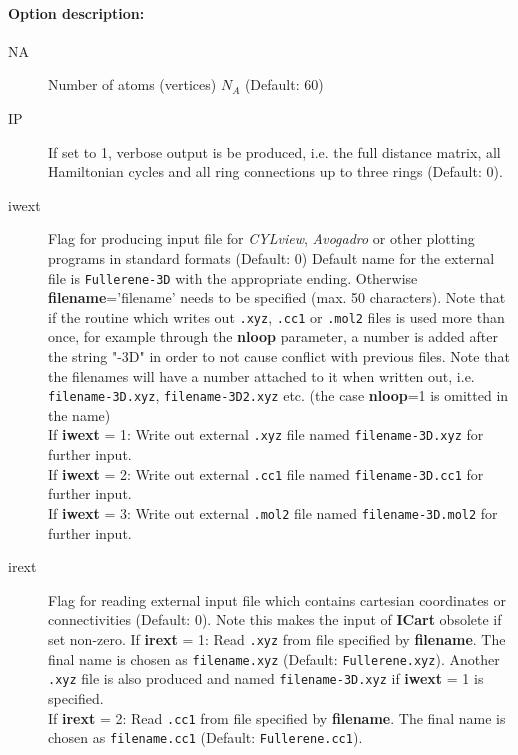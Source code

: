 \documentclass[article,a4paper,twoside]{memoir}
\newcommand{\program}[1]{\textit{#1}}
\newcommand{\filename}[1]{\texttt{#1}}
\newcommand{\paramname}[1]{{\color{green}\textbf{#1}}}
\begin{document}
\paragraph{Option description:}
\begin{description}
\item[{NA}]   Number of atoms (vertices) $N_A$ (Default: 60)
\item[{IP}]  If set to 1, verbose output is be produced, i.e. the full distance matrix, all Hamiltonian cycles 
  and all ring connections up to three rings (Default: 0).
\item[{iwext}] Flag for producing input file for \program{CYLview}, \program{Avogadro} or other plotting programs in standard formats (Default: 0)
  Default name for the external file is \filename{Fullerene-3D} with the appropriate ending. Otherwise \paramname{filename}='filename' needs to be specified (max. 50 characters).
  Note that if the routine which writes out \filename{.xyz}, \filename{.cc1} or \filename{.mol2} files is used more than once, for example through the \paramname{nloop} parameter,
  a number is added after the string "-3D" in order to not cause conflict with previous files. Note that the filenames will have a number attached to it when written out,
  i.e. \filename{filename-3D.xyz}, \filename{filename-3D2.xyz} etc. (the case \paramname{nloop}=1 is omitted in the name)\\
  If \paramname{iwext} = 1: Write out external \filename{.xyz}  file named \filename{filename-3D.xyz} for further input.\\
  If \paramname{iwext} = 2: Write out external \filename{.cc1}  file named \filename{filename-3D.cc1} for further input.\\
  If \paramname{iwext} = 3: Write out external \filename{.mol2} file named \filename{filename-3D.mol2} for further input.\\
\item[{irext}] Flag for reading external input file which contains cartesian coordinates or connectivities (Default: 0). Note this makes the input of \paramname{ICart} obsolete if set non-zero.
  If \paramname{irext} = 1: Read \filename{.xyz} from file specified by \paramname{filename}. The final name is chosen as \filename{filename.xyz} (Default: \filename{Fullerene.xyz}). 
  Another \filename{.xyz} file is also produced and named \filename{filename-3D.xyz} if \paramname{iwext} = 1 is specified.\\
  If \paramname{irext} = 2: Read \filename{.cc1} from file specified by \paramname{filename}. The final name is chosen as \filename{filename.cc1} (Default: \filename{Fullerene.cc1}). 

\end{description}
\end{document}
